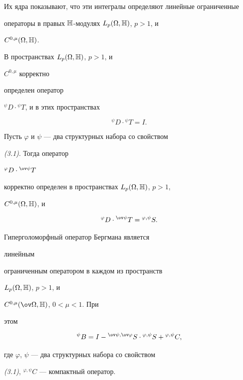 Их ядра показывают, что эти интегралы определяют линейные ограниченные 


операторы в правых $\Bbb H$-модулях $L_p(\Omega,\Bbb H)$, $p>1$, и 


$C^{0,\mu}(\Omega,\Bbb H)$. 


 


\begin{thm} В пространствах $L_p(\Omega,\Bbb H)$, $p>1$, и 


$C^{0,\mu}$ корректно 


определен оператор 


${}^\psi D\cdot{}^\psi T$, и в этих пространствах 


$$ 


{}^\psi D\cdot{}^\psi T=I. 


$$ 


 


Пусть $\varphi$ и $\psi$ --- два структурных набора со свойством 


{\em (3.1)}. Тогда оператор 


${}^\varphi D\cdot{}^{\ov\psi}T$ 


корректно определен в пространствах $L_p(\Omega,\Bbb H)$, $p>1$,


$C^{0,\mu}(\Omega,\Bbb H)$, и 


$$ 


{}^\varphi D\cdot{}^{\ov\psi}T={}^{\varphi,\psi}S. 


$$ 


\end{thm} 


 


\begin{thm} Гиперголоморфный оператор Бергмана является 


линейным 


ограниченным оператором в каждом из пространств 


$L_p(\Omega,\Bbb H)$, $p>1$, и 


$C^{0,\mu}(\ov\Omega,\Bbb H)$, $0<\mu<1$. При 


этом 


$$ 


{}^\psi B=I-{}^{\ov\psi,\ov\varphi}S\cdot 


{}^{\varphi,\psi}S+{}^{\varphi,\psi}C, 


$$ 


где $\varphi$, $\psi$ --- два структурных набора со свойством 


{\em (3.1)}, ${}^{\varphi,\psi}C$ --- компактный оператор. 


\end{thm} 


